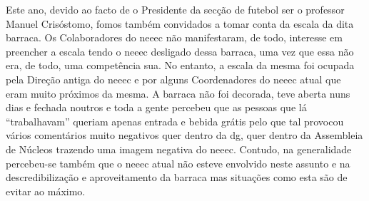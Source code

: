 Este ano, devido ao facto de o Presidente da secção de futebol ser o professor Manuel Crisóstomo, fomos também convidados a tomar conta da escala da dita barraca. Os Colaboradores do \acrshort{neeec} não manifestaram, de todo, interesse em preencher a escala tendo o \acrshort{neeec} desligado dessa barraca, uma vez que essa não era, de todo, uma competência sua. No entanto, a escala da mesma foi ocupada pela Direção antiga do \acrshort{neeec} e por alguns Coordenadores do \acrshort{neeec} atual que eram muito próximos da mesma. A barraca não foi decorada, teve aberta nuns dias e fechada noutros e toda a gente percebeu que as pessoas que lá “trabalhavam” queriam apenas entrada e bebida grátis pelo que tal provocou vários comentários muito negativos quer dentro da \acrshort{dg}, quer dentro da Assembleia de Núcleos trazendo uma imagem negativa do \acrshort{neeec}. Contudo, na generalidade percebeu-se também que o \acrshort{neeec} atual não esteve envolvido neste assunto e na descredibilização e aproveitamento da barraca mas situações como esta são de evitar ao máximo.